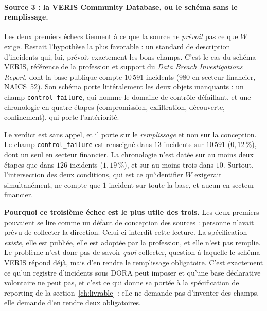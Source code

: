 \paragraph{Source 3 : la VERIS Community Database, ou le schéma sans le remplissage.}
Les deux premiers échecs tiennent à ce que la source ne \emph{prévoit} pas ce que $W$ exige.
Restait l'hypothèse la plus favorable : un standard de description d'incidents qui, lui,
prévoit exactement les bons champs. C'est le cas du schéma VERIS, référence de la
profession et support du \emph{Data Breach Investigations Report}, dont la base publique
compte $10\,591$ incidents ($980$ en secteur financier, NAICS~52). Son schéma porte
littéralement les deux objets manquants : un champ \texttt{control\_failure}, qui nomme le
domaine de contrôle défaillant, et une chronologie en quatre étapes
(compromission, exfiltration, découverte, confinement), qui porte l'antériorité.

Le verdict est sans appel, et il porte sur le \emph{remplissage} et non sur la conception.
Le champ \texttt{control\_failure} est renseigné dans $13$ incidents sur $10\,591$
($0{,}12\,\%$), dont un seul en secteur financier. La chronologie n'est datée sur au
moins deux étapes que dans $126$ incidents ($1{,}19\,\%$), et sur au moins trois dans $10$.
Surtout, l'intersection des deux conditions, qui est ce qu'identifier $W$ exigerait
simultanément, ne compte que $1$ incident sur toute la base, et aucun en
secteur financier.

\begin{cle}
\textbf{Pourquoi ce troisième échec est le plus utile des trois.} Les deux premiers pouvaient
se lire comme un défaut de conception des sources : personne n'avait prévu de collecter la
direction. Celui-ci interdit cette lecture. La spécification \emph{existe}, elle est publiée,
elle est adoptée par la profession, et elle n'est pas remplie. Le problème n'est donc
pas de savoir \emph{quoi} collecter, question à laquelle le schéma VERIS répond déjà,
mais d'en rendre le remplissage obligatoire. C'est exactement ce qu'un registre
d'incidents sous DORA peut imposer et qu'une base déclarative volontaire ne peut pas, et c'est
ce qui donne sa portée à la spécification de reporting de la section~\ref{ch:livrable} : elle
ne demande pas d'inventer des champs, elle demande d'en rendre deux obligatoires.
\end{cle}




